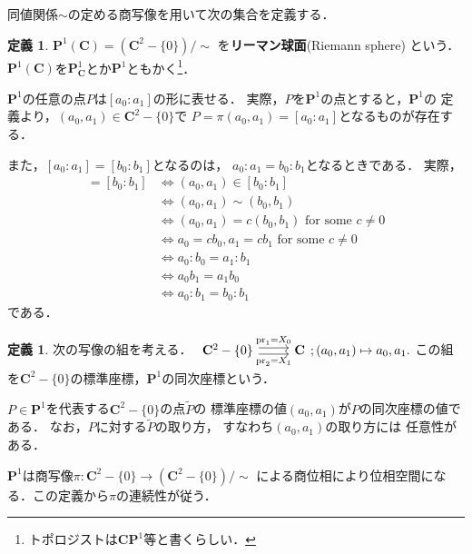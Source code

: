 \documentclass[11pt, a4paper, dvipdfmx, draft]{jsarticle}
\theoremstyle{definition}
\newtheorem{Definition}[Axiom]{定義}
\newcommand{\cc}{\mathbf{C}}
\newcommand{\pp}{\mathbf{P}}
\newcommand{\pr}{\mathop{\mathrm{pr}}\nolimits} %
\theoremstyle{mystyle}
\numberwithin{equation}{section} %
\begin{document}
同値関係${\sim}$の定める商写像を用いて次の集合を定義する．

\begin{Definition}
    $\pp^{1}(\cc) = \left(\cc^{2}-\{0\}\right)/{\sim}$
    を\textbf{リーマン球面}(Riemann sphere) という．
    $\pp^{1}(\cc)$を$\pp^{1}_{\cc}$とか$\pp^{1}$ともかく\footnote{トポロジストは$\cc\pp^1$等と書くらしい．}．
\end{Definition}

$\pp^1$の任意の点$P$は$[a_0\colon a_1]$の形に表せる．
実際，$P$を$\pp^1$の点とすると，$\pp^1$の
定義より，$(a_{0},a_{1})\in \cc^{2}-\{0\}$で
$P=\pi(a_{0},a_{1})=[a_0\colon a_1]$となるものが存在する．

また，$[a_0\colon a_1]=[b_0\colon b_1]$となるのは，
$a_0\colon a_1=b_0\colon b_1$となるときである．
実際，
\begin{align*}
    [a_0\colon a_1]=[b_0\colon b_1]
    &\Longleftrightarrow
    (a_0, a_1)\in[b_0\colon b_1]\\
    &\Longleftrightarrow
    (a_0, a_1)\sim(b_0, b_1)\\
    &\Longleftrightarrow
    (a_0, a_1)=c(b_0, b_1) \text{ for some }c\neq0\\
    &\Longleftrightarrow
    a_0=cb_0, a_1=cb_1 \text{ for some }c\neq0\\    
    &\Longleftrightarrow
    a_0\colon b_0 = a_1 \colon b_1\\
    &\Longleftrightarrow
    a_0 b_1 = a_1 b_0\\
    &\Longleftrightarrow
    a_0\colon b_1 = b_0 \colon b_1
\end{align*}
である．

\begin{Definition}\label{def:coord1}
    次の写像の組を考える．
    $\begin{tikzcd}
      {\cc^{2}-\{0\}}
        \arrow[r, shift left ,"\pr_1=X_0"]
        \arrow[r, shift right,"\pr_2=X_1"']
      & {\cc}
    \end{tikzcd}; (a_0,a_1)\mapsto a_0,a_1.$
    この組を$\cc^{2}-\{0\}$の標準座標，$\pp^1$の同次座標という．
\end{Definition}
$P\in\pp^1$を代表する$\cc^{2}-\{0\}$の点$\widetilde{P}$の
標準座標の値$(a_0,a_1)$が$P$の同次座標の値である．
なお，$P$に対する$\widetilde{P}$の取り方，
すなわち$(a_0,a_1)$の取り方には
任意性がある．

$\pp^{1}$は商写像$\pi \colon \cc^{2}-\{0\}
\longrightarrow\left(\cc^{2}-\{0\}\right)/{\sim}$
による商位相により位相空間になる．この定義から$\pi$の連続性が従う．
\end{document}
